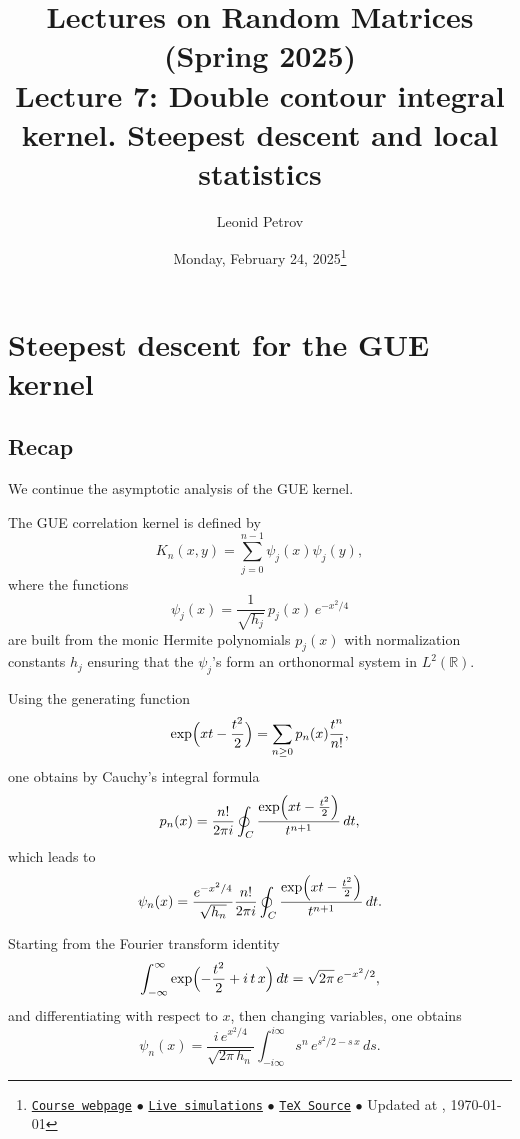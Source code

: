 \documentclass[letterpaper,11pt,oneside,reqno]{article}
\numberwithin{equation}{section}
\theoremstyle{definition}
\begin{document}
\title{Lectures on Random Matrices
(Spring 2025)
\\Lecture 7: Double contour integral kernel. Steepest descent and local statistics}


\date{Monday, February 24, 2025\footnote{\href{https://lpetrov.cc/rmt25/}{\texttt{Course webpage}}
$\bullet$ \href{https://lpetrov.cc/simulations/model/random-matrices/}{\texttt{Live simulations}}
$\bullet$ \href{https://lpetrov.cc/rmt25/rmt25-notes/rmt2025-l07.tex}{\texttt{TeX Source}}
$\bullet$
Updated at \currenttime, \today}}



\author{Leonid Petrov}


\maketitle
\tableofcontents


\section{Steepest descent for the GUE kernel}
\label{sec:steepest-descent-GUE}

\subsection{Recap}

We continue the asymptotic analysis of the GUE kernel.

The GUE correlation kernel is defined by
\[
K_n(x,y)=\sum_{j=0}^{n-1}\psi_j(x)\psi_j(y),
\]
where the functions
\[
\psi_j(x)=\frac{1}{\sqrt{h_j}}\,p_j(x)\,e^{-x^2/4}
\]
are built from the monic Hermite polynomials \(p_j(x)\) with normalization constants \(h_j\) ensuring that the \(\psi_j\)'s form an orthonormal system in \(L^2(\mathbb{R})\).

Using the generating function
\[
\exp\Bigl(xt-\frac{t^2}{2}\Bigr)=\sum_{n\ge0}p_n(x)\frac{t^n}{n!},
\]
one obtains by Cauchy’s integral formula
\[
p_n(x)=\frac{n!}{2\pi i}\oint_C\frac{\exp\Bigl(xt-\frac{t^2}{2}\Bigr)}{t^{n+1}}\,dt,
\]
which leads to
\[
\psi_n(x)=\frac{e^{-x^2/4}}{\sqrt{h_n}}\frac{n!}{2\pi i}\oint_C\frac{\exp\Bigl(xt-\frac{t^2}{2}\Bigr)}{t^{n+1}}\,dt.
\]

Starting from the Fourier transform identity
\[
\int_{-\infty}^{\infty} \exp\Bigl(-\frac{t^2}{2}+i\,t\,x\Bigr)\,dt
=\sqrt{2\pi}\,e^{-x^2/2},
\]
and differentiating with respect to \(x\), then changing variables, one obtains
\[
\psi_n(x)=\frac{i\,e^{x^2/4}}{\sqrt{2\pi\,h_n}}
\int_{-i\infty}^{i\infty} s^n\,e^{s^2/2- s\,x}\,ds.
\]
\end{document}
